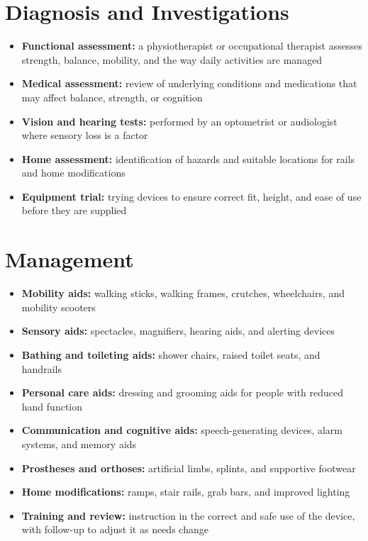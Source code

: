 \section*{Diagnosis and Investigations}
\begin{itemize}
    \item \textbf{Functional assessment:} a physiotherapist or occupational therapist assesses strength, balance, mobility, and the way daily activities are managed
    \item \textbf{Medical assessment:} review of underlying conditions and medications that may affect balance, strength, or cognition
    \item \textbf{Vision and hearing tests:} performed by an optometrist or audiologist where sensory loss is a factor
    \item \textbf{Home assessment:} identification of hazards and suitable locations for rails and home modifications
    \item \textbf{Equipment trial:} trying devices to ensure correct fit, height, and ease of use before they are supplied
\end{itemize}

\section*{Management}
\begin{itemize}
    \item \textbf{Mobility aids:} walking sticks, walking frames, crutches, wheelchairs, and mobility scooters
    \item \textbf{Sensory aids:} spectacles, magnifiers, hearing aids, and alerting devices
    \item \textbf{Bathing and toileting aids:} shower chairs, raised toilet seats, and handrails
    \item \textbf{Personal care aids:} dressing and grooming aids for people with reduced hand function
    \item \textbf{Communication and cognitive aids:} speech-generating devices, alarm systems, and memory aids
    \item \textbf{Prostheses and orthoses:} artificial limbs, splints, and supportive footwear
    \item \textbf{Home modifications:} ramps, stair rails, grab bars, and improved lighting
    \item \textbf{Training and review:} instruction in the correct and safe use of the device, with follow-up to adjust it as needs change
\end{itemize}

